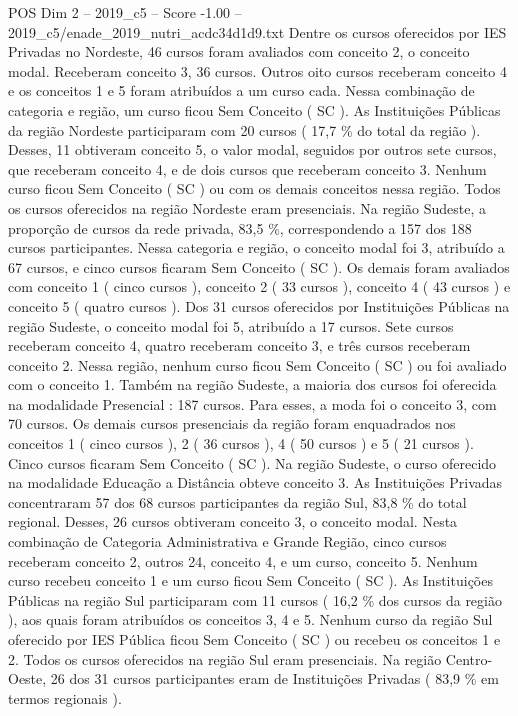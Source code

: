 \begin{textsample}{POS Dim 2 – 2019\_c5 – Score -1.00 – 2019\_c5/enade\_2019\_nutri\_acdc34d1d9.txt}
Dentre os cursos oferecidos por IES Privadas no Nordeste, 46 cursos foram avaliados com conceito 2, o conceito modal.
Receberam conceito 3, 36 cursos.
Outros oito cursos receberam conceito 4 e os conceitos 1 e 5 foram atribuídos a um curso cada.
Nessa combinação de categoria e região, um curso ficou Sem Conceito ( SC ).
As Instituições Públicas da região Nordeste participaram com 20 cursos ( 17,7 \% do total da região ).
Desses, 11 obtiveram conceito 5, o valor modal, seguidos por outros sete cursos, que receberam conceito 4, e de dois cursos que receberam conceito 3.
Nenhum curso ficou Sem Conceito ( SC ) ou com os demais conceitos nessa região.
Todos os cursos oferecidos na região Nordeste eram presenciais.
Na região Sudeste, a proporção de cursos da rede privada, 83,5 \%, correspondendo a 157 dos 188 cursos participantes.
Nessa categoria e região, o conceito modal foi 3, atribuído a 67 cursos, e cinco cursos ficaram Sem Conceito ( SC ).
Os demais foram avaliados com conceito 1 ( cinco cursos ), conceito 2 ( 33 cursos ), conceito 4 ( 43 cursos ) e conceito 5 ( quatro cursos ).
Dos 31 cursos oferecidos por Instituições Públicas na região Sudeste, o conceito modal foi 5, atribuído a 17 cursos.
Sete cursos receberam conceito 4, quatro receberam conceito 3, e três cursos receberam conceito 2.
Nessa região, nenhum curso ficou Sem Conceito ( SC ) ou foi avaliado com o conceito 1.
Também na região Sudeste, a maioria dos cursos foi oferecida na modalidade Presencial : 187 cursos.
Para esses, a moda foi o conceito 3, com 70 cursos.
Os demais cursos presenciais da região foram enquadrados nos conceitos 1 ( cinco cursos ), 2 ( 36 cursos ), 4 ( 50 cursos ) e 5 ( 21 cursos ).
Cinco cursos ficaram Sem Conceito ( SC ).
Na região Sudeste, o curso oferecido na modalidade Educação a Distância obteve conceito 3.
As Instituições Privadas concentraram 57 dos 68 cursos participantes da região Sul, 83,8 \% do total regional.
Desses, 26 cursos obtiveram conceito 3, o conceito modal.
Nesta combinação de Categoria Administrativa e Grande Região, cinco cursos receberam conceito 2, outros 24, conceito 4, e um curso, conceito 5.
Nenhum curso recebeu conceito 1 e um curso ficou Sem Conceito ( SC ).
As Instituições Públicas na região Sul participaram com 11 cursos ( 16,2 \% dos cursos da região ), aos quais foram atribuídos os conceitos 3, 4 e 5.
Nenhum curso da região Sul oferecido por IES Pública ficou Sem Conceito ( SC ) ou recebeu os conceitos 1 e 2.
Todos os cursos oferecidos na região Sul eram presenciais.
Na região Centro-Oeste, 26 dos 31 cursos participantes eram de Instituições Privadas ( 83,9 \% em termos regionais ).

\end{textsample}
